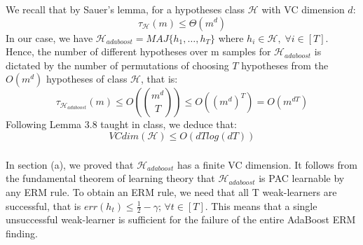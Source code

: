 \subsubsection{}
We recall that by Sauer's lemma, for a hypotheses class $\mathcal{H}$ with VC dimension $d$:
\begin{equation*}
    \tau_{\mathcal{H}}(m) \leq \Theta(m^d)
\end{equation*}
In our case, we have $\mathcal{H}_\mathit{adaboost} = MAJ\{h_1, \dotsc , h_T\}$ where $h_i \in \mathcal{H}, \; \forall i \in [T]$. Hence, the number of different hypotheses over m samples for $\mathcal{H}_\mathit{adaboost}$ is dictated by the number of permutations of choosing $T$ hypotheses from the $O(m^d)$ hypotheses of class $\mathcal{H}$, that is:
\begin{equation*}
    \tau_{\mathcal{H}_\mathit{adaboost}}(m) \leq O(\binom{m^d}{T}) \leq O((m^d) ^ T) = O(m^{dT})
\end{equation*}
Following Lemma 3.8 taught in class, we deduce that:
\begin{equation*}
    VCdim(\mathcal{H}) \leq O(dT log(dT))
\end{equation*}

\subsubsection{}
In section (a), we proved that $\mathcal{H}_\mathit{adaboost}$ has a finite VC dimension. It follows from the fundamental theorem of learning theory that $\mathcal{H}_\mathit{adaboost}$ is PAC learnable by any ERM rule.
To obtain an ERM rule, we need that all T weak-learners are successful, that is $err(h_t) \leq \frac{1}{2} - \gamma ;\, \forall t\in [T]$. This means that a single unsuccessful weak-learner is sufficient for the failure of the entire AdaBoost ERM finding.

